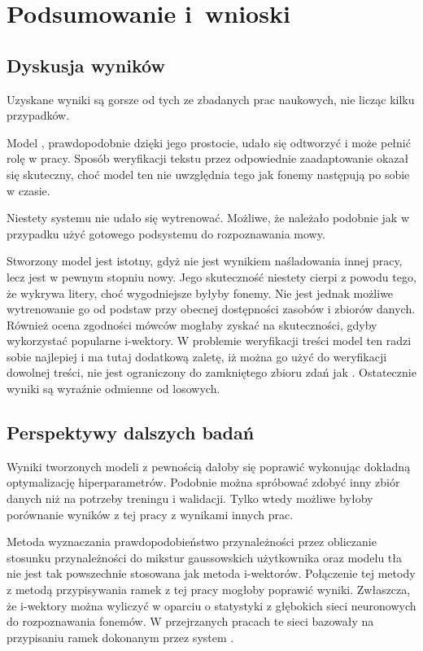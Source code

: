 \chapter{Podsumowanie i~wnioski}\label{chap:podsumowanie}

\section{Dyskusja wyników}

Uzyskane wyniki są gorsze od tych ze zbadanych prac naukowych, nie licząc kilku przypadków.

Model , prawdopodobnie dzięki jego prostocie, udało się odtworzyć i może pełnić
rolę  w pracy. Sposób weryfikacji tekstu przez odpowiednie zaadaptowanie 
okazał się skuteczny, choć model ten nie uwzględnia tego jak fonemy następują po sobie w czasie.

Niestety systemu  nie udało się wytrenować. Możliwe, że należało podobnie jak w przypadku 
użyć gotowego podsystemu do rozpoznawania mowy.

Stworzony model  jest istotny, gdyż nie jest wynikiem naśladowania innej pracy, lecz jest w pewnym
stopniu nowy. Jego skuteczność niestety cierpi z powodu tego, że  wykrywa litery, choć wygodniejsze byłyby
fonemy. Nie jest jednak możliwe wytrenowanie go od podstaw przy obecnej dostępności zasobów i zbiorów danych.
Również ocena zgodności mówców mogłaby zyskać na skuteczności, gdyby wykorzystać popularne i-wektory. W problemie weryfikacji
treści model ten radzi sobie najlepiej i ma tutaj dodatkową zaletę, iż można go użyć do weryfikacji dowolnej treści, nie
jest ograniczony do zamkniętego zbioru zdań jak . Ostatecznie wyniki są wyraźnie odmienne od losowych.

\section{Perspektywy dalszych badań}

Wyniki tworzonych modeli z pewnością dałoby się poprawić wykonując dokładną
optymalizację hiperparametrów. Podobnie można spróbować zdobyć inny zbiór danych
niż  na potrzeby treningu i walidacji. Tylko wtedy możliwe
byłoby porównanie wyników z tej pracy z wynikami innych prac.

Metoda wyznaczania prawdopodobieństwo przynależności przez obliczanie stosunku
przynależności do mikstur gaussowskich użytkownika oraz modelu tła nie jest
tak powszechnie stosowana jak metoda i-wektorów. Połączenie tej metody
z metodą przypisywania ramek z tej pracy mogłoby poprawić wyniki.
Zwłaszcza, że i-wektory można wyliczyć w oparciu o statystyki z głębokich sieci
neuronowych do rozpoznawania fonemów. W przejrzanych pracach te sieci bazowały
na przypisaniu ramek dokonanym przez system .

